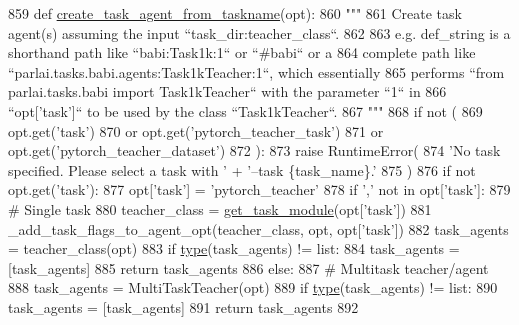 \begin{DoxyCode}
859 \textcolor{keyword}{def }\hyperlink{namespaceparlai_1_1core_1_1agents_ab4473fa54af02b5ab385b41b51dacd10}{create\_task\_agent\_from\_taskname}(opt):
860     \textcolor{stringliteral}{"""}
861 \textcolor{stringliteral}{    Create task agent(s) assuming the input ``task\_dir:teacher\_class``.}
862 \textcolor{stringliteral}{}
863 \textcolor{stringliteral}{    e.g. def\_string is a shorthand path like ``babi:Task1k:1`` or ``#babi`` or a}
864 \textcolor{stringliteral}{    complete path like ``parlai.tasks.babi.agents:Task1kTeacher:1``, which essentially}
865 \textcolor{stringliteral}{    performs ``from parlai.tasks.babi import Task1kTeacher`` with the parameter ``1`` in}
866 \textcolor{stringliteral}{    ``opt['task']`` to be used by the class ``Task1kTeacher``.}
867 \textcolor{stringliteral}{    """}
868     \textcolor{keywordflow}{if} \textcolor{keywordflow}{not} (
869         opt.get(\textcolor{stringliteral}{'task'})
870         \textcolor{keywordflow}{or} opt.get(\textcolor{stringliteral}{'pytorch\_teacher\_task'})
871         \textcolor{keywordflow}{or} opt.get(\textcolor{stringliteral}{'pytorch\_teacher\_dataset'})
872     ):
873         \textcolor{keywordflow}{raise} RuntimeError(
874             \textcolor{stringliteral}{'No task specified. Please select a task with '} + \textcolor{stringliteral}{'--task \{task\_name\}.'}
875         )
876     \textcolor{keywordflow}{if} \textcolor{keywordflow}{not} opt.get(\textcolor{stringliteral}{'task'}):
877         opt[\textcolor{stringliteral}{'task'}] = \textcolor{stringliteral}{'pytorch\_teacher'}
878     \textcolor{keywordflow}{if} \textcolor{stringliteral}{','} \textcolor{keywordflow}{not} \textcolor{keywordflow}{in} opt[\textcolor{stringliteral}{'task'}]:
879         \textcolor{comment}{# Single task}
880         teacher\_class = \hyperlink{namespaceparlai_1_1core_1_1agents_a530b987b67a802a8e9c5fa3c24ae942f}{get\_task\_module}(opt[\textcolor{stringliteral}{'task'}])
881         \_add\_task\_flags\_to\_agent\_opt(teacher\_class, opt, opt[\textcolor{stringliteral}{'task'}])
882         task\_agents = teacher\_class(opt)
883         \textcolor{keywordflow}{if} \hyperlink{namespaceparlai_1_1agents_1_1tfidf__retriever_1_1build__tfidf_ad5dfae268e23f506da084a9efb72f619}{type}(task\_agents) != list:
884             task\_agents = [task\_agents]
885         \textcolor{keywordflow}{return} task\_agents
886     \textcolor{keywordflow}{else}:
887         \textcolor{comment}{# Multitask teacher/agent}
888         task\_agents = MultiTaskTeacher(opt)
889         \textcolor{keywordflow}{if} \hyperlink{namespaceparlai_1_1agents_1_1tfidf__retriever_1_1build__tfidf_ad5dfae268e23f506da084a9efb72f619}{type}(task\_agents) != list:
890             task\_agents = [task\_agents]
891         \textcolor{keywordflow}{return} task\_agents
892 \end{DoxyCode}
\mbox{\label{namespaceparlai_1_1core_1_1agents_a14a9d134d76ffd0509e50703d0f2c949}} 
